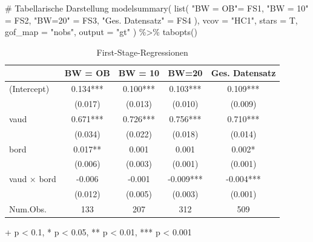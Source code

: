 \documentclass[
  a4paper,
  DIV=11,
  oneside]{scrreprt}
\newenvironment{Shaded}{\begin{snugshade}}{\end{snugshade}}
\newcommand{\AttributeTok}[1]{\textcolor[rgb]{0.40,0.45,0.13}{#1}}
\newcommand{\CommentTok}[1]{\textcolor[rgb]{0.37,0.37,0.37}{#1}}
\newcommand{\FunctionTok}[1]{\textcolor[rgb]{0.28,0.35,0.67}{#1}}
\newcommand{\NormalTok}[1]{\textcolor[rgb]{0.00,0.23,0.31}{#1}}
\newcommand{\OtherTok}[1]{\textcolor[rgb]{0.00,0.23,0.31}{#1}}
\newcommand{\SpecialCharTok}[1]{\textcolor[rgb]{0.37,0.37,0.37}{#1}}
\newcommand{\StringTok}[1]{\textcolor[rgb]{0.13,0.47,0.30}{#1}}
\begin{document}
\begin{Shaded}
\begin{Highlighting}[]
\CommentTok{\# Tabellarische Darstellung}
\FunctionTok{modelsummary}\NormalTok{(}
  \FunctionTok{list}\NormalTok{(}
    \StringTok{"BW = OB"}\OtherTok{=}\NormalTok{ FS1, }
    \StringTok{"BW = 10"} \OtherTok{=}\NormalTok{ FS2, }
    \StringTok{"BW=20"} \OtherTok{=}\NormalTok{ FS3, }
    \StringTok{"Ges. Datensatz"} \OtherTok{=}\NormalTok{ FS4}
\NormalTok{  ), }
  \AttributeTok{vcov =} \StringTok{"HC1"}\NormalTok{, }
  \AttributeTok{stars =}\NormalTok{ T, }
  \AttributeTok{gof\_map =} \StringTok{"nobs"}\NormalTok{, }
  \AttributeTok{output =} \StringTok{"gt"}
\NormalTok{) }\SpecialCharTok{\%\textgreater{}\%}
  \FunctionTok{tabopts}\NormalTok{()}
\end{Highlighting}
\end{Shaded}

\begingroup
\fontsize{12.0pt}{14.4pt}\selectfont
\setlength{\LTpost}{0mm}

\begin{longtable}{lcccc}

\caption{\label{tbl-BastenBetzFS}First-Stage-Regressionen}

\tabularnewline

\toprule
  & BW = OB & BW = 10 & BW=20 & Ges. Datensatz \\ 
\midrule\addlinespace[2.5pt]
(Intercept) & 0.134*** & 0.100*** & 0.103*** & 0.109*** \\ 
 & (0.017) & (0.013) & (0.010) & (0.009) \\ 
vaud & 0.671*** & 0.726*** & 0.756*** & 0.710*** \\ 
 & (0.034) & (0.022) & (0.018) & (0.014) \\ 
bord & 0.017** & 0.001 & 0.001 & 0.002* \\ 
 & (0.006) & (0.003) & (0.001) & (0.001) \\ 
vaud × bord & -0.006 & -0.001 & -0.009*** & -0.004*** \\ 
{} & {(0.012)} & {(0.005)} & {(0.003)} & {(0.001)} \\ 
Num.Obs. & 133 & 207 & 312 & 509 \\ 
\bottomrule

\end{longtable}

\begin{minipage}{\linewidth}
+ p < 0.1, * p < 0.05, ** p < 0.01, *** p < 0.001\\
\end{minipage}
\endgroup
\end{document}
